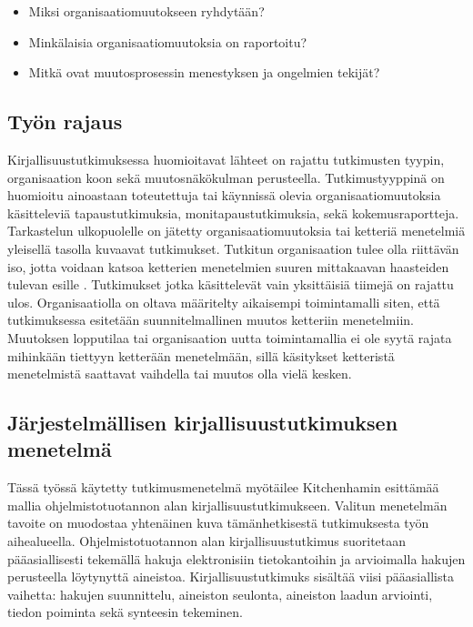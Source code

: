 \begin{itemize}
\item Miksi organisaatiomuutokseen ryhdytään?
\item Minkälaisia organisaatiomuutoksia on raportoitu?
\item Mitkä ovat muutosprosessin menestyksen ja ongelmien tekijät?
\end{itemize}

\subsection{Työn rajaus}
Kirjallisuustutkimuksessa huomioitavat lähteet on rajattu tutkimusten tyypin,
organisaation koon sekä muutosnäkökulman perusteella. Tutkimustyyppinä on
huomioitu ainoastaan toteutettuja tai käynnissä olevia organisaatiomuutoksia
käsitteleviä tapaustutkimuksia, monitapaustutkimuksia, sekä kokemusraportteja.
Tarkastelun ulkopuolelle on jätetty organisaatiomuutoksia tai ketteriä
menetelmiä yleisellä tasolla kuvaavat tutkimukset. Tutkitun organisaation tulee
olla riittävän iso, jotta voidaan katsoa ketterien menetelmien suuren
mittakaavan haasteiden tulevan esille . Tutkimukset jotka
käsittelevät vain yksittäisiä tiimejä on rajattu ulos. Organisaatiolla on oltava
määritelty aikaisempi toimintamalli siten, että tutkimuksessa esitetään
suunnitelmallinen muutos ketteriin menetelmiin. Muutoksen lopputilaa tai
organisaation uutta toimintamallia ei ole syytä rajata mihinkään tiettyyn
ketterään menetelmään, sillä käsitykset ketteristä menetelmistä saattavat
vaihdella tai muutos olla vielä kesken.

\subsection{Järjestelmällisen kirjallisuustutkimuksen menetelmä}

Tässä työssä käytetty tutkimusmenetelmä myötäilee Kitchenhamin esittämää mallia
ohjelmistotuotannon alan kirjallisuustutkimukseen. Valitun menetelmän tavoite on
muodostaa yhtenäinen kuva tämänhetkisestä tutkimuksesta työn aihealueella.
Ohjelmistotuotannon alan kirjallisuustutkimus suoritetaan pääasiallisesti
tekemällä hakuja elektronisiin tietokantoihin ja arvioimalla hakujen perusteella
löytynyttä aineistoa. Kirjallisuustutkimuks sisältää viisi pääasiallista
vaihetta: hakujen suunnittelu, aineiston seulonta, aineiston laadun arviointi,
tiedon poiminta sekä synteesin tekeminen. 


